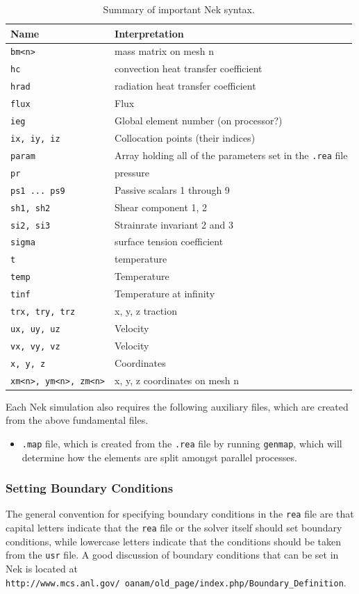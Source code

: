 \documentclass[10pt]{article}
\numberwithin{equation}{section} %
\begin{document}
\begin{table}[H]
\caption{Summary of important Nek syntax.}
\centering
\begin{tabular}{p{5cm}p{10cm}}
\hline\hline
Name & Interpretation \\ [0.5ex]
\hline
{\tt bm<n>} & mass matrix on mesh n\\
{\tt hc} & convection heat transfer coefficient\\
{\tt hrad} & radiation heat transfer coefficient\\
{\tt flux} & Flux\\
{\tt ieg} & Global element number (on processor?)\\
{\tt ix, iy, iz} & Collocation points (their indices)\\
{\tt param} & Array holding all of the parameters set in the {\tt .rea} file\\
{\tt pr} & pressure\\
{\tt ps1 ... ps9} & Passive scalars 1 through 9\\
{\tt sh1, sh2} & Shear component 1, 2\\
{\tt si2, si3} & Strainrate invariant 2 and 3\\
{\tt sigma} & surface tension coefficient\\
{\tt t} & temperature\\
{\tt temp} & Temperature\\
{\tt tinf} & Temperature at infinity\\
{\tt trx, try, trz} & x, y, z traction\\
{\tt ux, uy, uz} & Velocity\\
{\tt vx, vy, vz} & Velocity\\
{\tt x, y, z} & Coordinates\\
{\tt xm<n>, ym<n>, zm<n>} & x, y, z coordinates on mesh n\\
\hline
\end{tabular}
\end{table}

Each Nek simulation also requires the following auxiliary files, which are created from the above fundamental files.

\begin{itemize}
\item {\tt .map} file, which is created from the {\tt .rea} file by running {\tt genmap}, which will determine how the elements are split amongst parallel processes. 
\end{itemize}

\subsubsection{Setting Boundary Conditions}
The general convention for specifying boundary conditions in the {\tt rea} file are that capital letters indicate that the {\tt rea} file or the solver itself should set boundary conditions, while lowercase letters indicate that the conditions should be taken from the {\tt usr} file. A good discussion of boundary conditions that can be set in Nek is located at {\tt http://www.mcs.anl.gov/~oanam/old\_page/index.php/Boundary\_Definition}.
\end{document}
